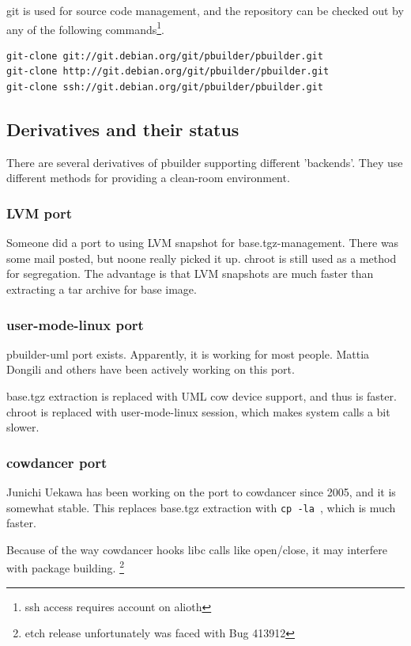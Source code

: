 \documentclass[a4paper]{article}
\begin{document}
git is used for source code management, and the repository can be
checked out by any of the following commands\footnote{ssh access
requires account on alioth}.

\begin{verbatim}
git-clone git://git.debian.org/git/pbuilder/pbuilder.git
git-clone http://git.debian.org/git/pbuilder/pbuilder.git
git-clone ssh://git.debian.org/git/pbuilder/pbuilder.git
\end{verbatim}

\subsection{Derivatives and their status}

There are several derivatives of pbuilder supporting different
'backends'. They use different methods for providing a clean-room
environment.


\subsubsection{LVM port}

Someone did a port to using LVM snapshot for base.tgz-management.  There
was some mail posted, but noone really picked it up.  chroot is still
used as a method for segregation. The advantage is that LVM snapshots
are much faster than extracting a tar archive for base image.

\subsubsection{user-mode-linux port}

pbuilder-uml port exists. Apparently, it is working for most people.
Mattia Dongili and others have been actively working on this port.

base.tgz extraction is replaced with UML cow device support, and thus is
faster. chroot is replaced with user-mode-linux session, which makes
system calls a bit slower.

\subsubsection{cowdancer port}

Junichi Uekawa has been working on the port to cowdancer since 2005, and
it is somewhat stable.  This replaces base.tgz extraction with
\texttt{cp -la }, which is much faster.

Because of the way cowdancer hooks libc calls like open/close, it may
interfere with package building.  \footnote{etch release unfortunately
was faced with Bug 413912}
\end{document}
